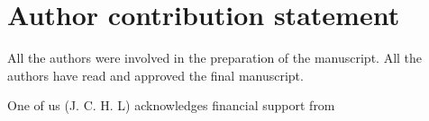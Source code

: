 \section{Author contribution statement}
All the authors were involved in the preparation of the manuscript.
All the authors have read and approved the final manuscript.

\begin{acknowledgement}
    One of us (J. C. H. L) acknowledges financial support from
\end{acknowledgement}
